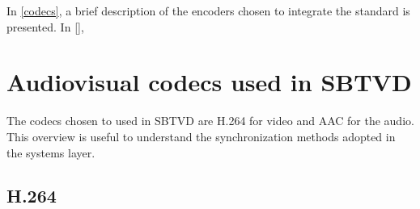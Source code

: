 \documentclass[
	12pt,				%
	openright,			%
	twoside,			%
	a4paper,			%
	brazil,
	french,				%
	english
	]{abntex2}
\begin{document}

In \autoref{codecs}, a brief description of the encoders chosen to integrate the standard is presented. In \autoref{}, 



%



\chapter{Audiovisual codecs used in SBTVD}
\label{codecs}

The codecs chosen to used in SBTVD are H.264 for video and AAC for the audio. This overview is useful to understand the synchronization methods adopted in the systems layer.

\section{H.264}
\end{document}

